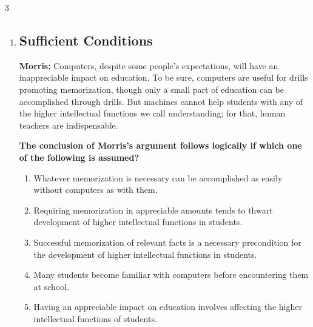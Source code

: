 \documentclass[9pt]{article}
\begin{document}
\begin{multicols}{3}
\begin{enumerate}
\item
\subsection*{Sufficient Conditions}
\noindent
\textbf{Morris:} Computers, despite some people's expectations, will have an inappreciable impact on education. To be sure, computers are useful for drills promoting memorization, though only a small part of education can be accomplished through drills. But machines cannot help students with any of the higher intellectual functions we call understanding; for that, human teachers are indispensable.


\noindent
\textbf{The conclusion of Morris's argument follows logically if which one of the following is assumed?}

\begin{enumerate}[label=(\alph*)]
    \item Whatever memorization is necessary can be accomplished as easily without computers as with them.
    \item Requiring memorization in appreciable amounts tends to thwart development of higher intellectual functions in students.
    \item Successful memorization of relevant facts is a necessary precondition for the development of higher intellectual functions in students.
    \item Many students become familiar with computers before encountering them at school.
    \item Having an appreciable impact on education involves affecting the higher intellectual functions of students.
\end{enumerate}
\end{enumerate}
\end{multicols}
\end{document}
